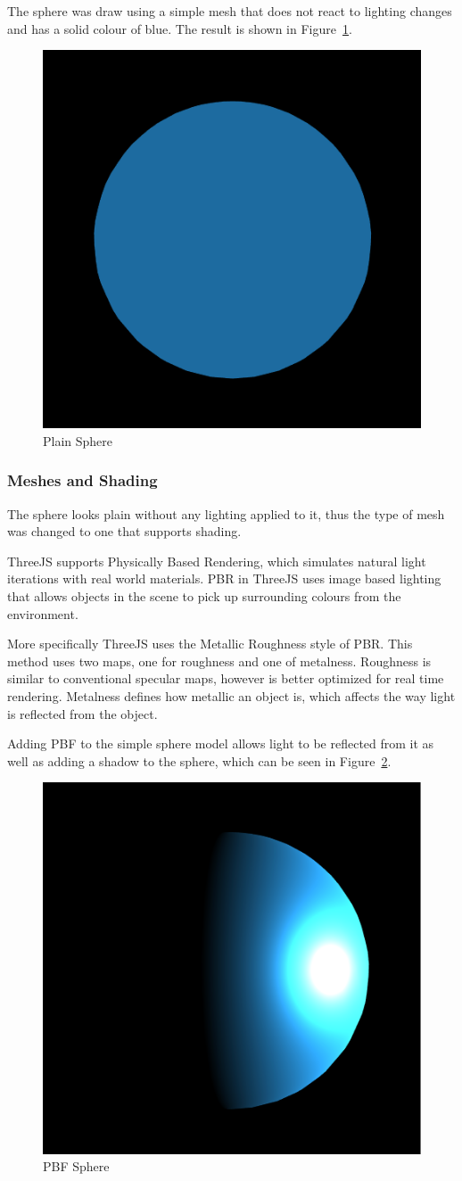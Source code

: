 \documentclass[]{article}
\begin{document}
The sphere was draw using a simple mesh that does not react to lighting changes and has a solid colour of blue.
The result is shown in Figure~\ref{fig:plainSphere}.

\begin{figure}[H]
   \centering
   \includegraphics[width=0.5\linewidth]{images/plain_sphere}
   \caption{Plain Sphere}
   \label{fig:plainSphere}
\end{figure}

\subsubsection{Meshes and Shading}

The sphere looks plain without any lighting applied to it,
thus the type of mesh was changed to one that supports shading.

ThreeJS supports Physically Based Rendering, which simulates natural light iterations with real world materials\cite{}.
PBR in ThreeJS uses image based lighting that allows objects in the scene to pick up surrounding colours from the environment.

More specifically ThreeJS uses the Metallic Roughness style of PBR.
This method uses two maps, one for roughness and one of metalness.
Roughness is similar to conventional specular maps,
however is better optimized for real time rendering\cite{}.
Metalness defines how metallic an object is,
which affects the way light is reflected from the object.

Adding PBF to the simple sphere model allows light to be reflected from it as well as adding a shadow to the sphere,
which can be seen in Figure~\ref{fig:pbf_sphere}.

\begin{figure}[H]
   \centering
   \includegraphics[width=0.5\linewidth]{images/pbf_sphere}
   \caption{PBF Sphere}
   \label{fig:pbf_sphere}
\end{figure}
\end{document}

